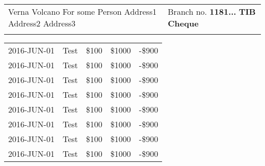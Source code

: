 \documentclass{article}%
\begin{document}
%
\normalsize%
\begin{tabu}{X[l] X[r]}%
\begin{minipage}[h]{0.49\textwidth}%
Verna Volcano%
\newline%
%
For some Person%
\newline%
%
Address1%
\newline%
%
Address2%
\newline%
%
Address3%
\end{minipage}&\begin{minipage}[t!]{0.49\textwidth}%
\flushright%
Branch no.%
\linebreak%
\textbf{1181...}%
\linebreak%
\textbf{TIB Cheque}%
\end{minipage}\\%
&\\%
\end{tabu}%
\begin{longtabu}{X[l] X[2l] X[r] X[r] X[r]}%
\hline%
%
2016{-}JUN{-}01&Test&\$100&\$1000&{-}\$900\\%
2016{-}JUN{-}01&Test&\$100&\$1000&{-}\$900\\%
%
2016{-}JUN{-}01&Test&\$100&\$1000&{-}\$900\\%
2016{-}JUN{-}01&Test&\$100&\$1000&{-}\$900\\%
%
2016{-}JUN{-}01&Test&\$100&\$1000&{-}\$900\\%
2016{-}JUN{-}01&Test&\$100&\$1000&{-}\$900\\%
%
2016{-}JUN{-}01&Test&\$100&\$1000&{-}\$900\\%
2016{-}JUN{-}01&Test&\$100&\$1000&{-}\$900\\%
\end{longtabu}%
\end{document}
